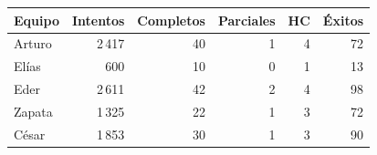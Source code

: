 \begin{tabularx}{\linewidth}{Yrrrrr}
\toprule
Equipo & Intentos & Completos & Parciales & HC & Éxitos \\ \midrule
Arturo & 2\,417 & 40 & 1 & 4 & 72 \\
Elías & 600 & 10 & 0 & 1 & 13 \\
Eder & 2\,611 & 42 & 2 & 4 & 98 \\
Zapata & 1\,325 & 22 & 1 & 3 & 72 \\
César & 1\,853 & 30 & 1 & 3 & 90 \\
\bottomrule\end{tabularx}
